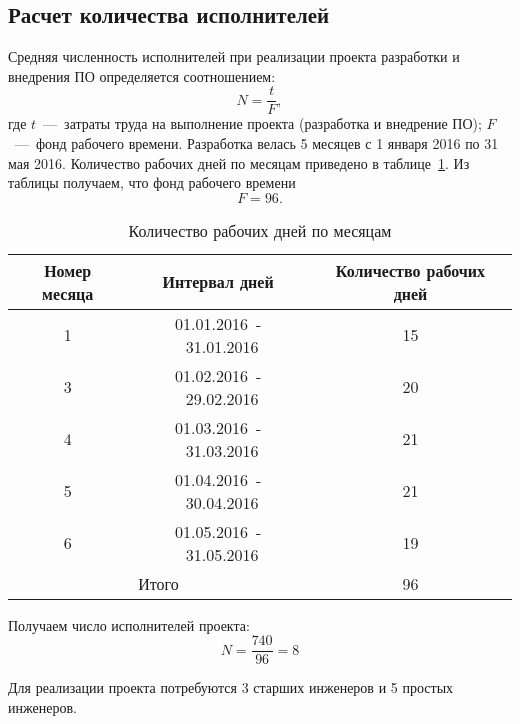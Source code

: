     \subsection{Расчет количества исполнителей}
    \label{subsec:slaves}
        Средняя численность исполнителей при реализации проекта разработки и внедрения ПО определяется соотношением:
        \begin{equation}
            N=\dfrac {t} {F},
        \end{equation}
        где $t$~---~затраты труда на выполнение проекта (разработка и внедрение ПО); $F$~---~фонд рабочего времени.
        Разработка велась 5 месяцев с 1 января 2016 по 31 мая 2016.
        Количество рабочих дней по месяцам приведено в таблице~\ref{tabular:work_day}. Из таблицы получаем, что фонд рабочего времени $$F=96.$$
        \begin{table}[h!]
            \caption{Количество рабочих дней по месяцам\bigskip}
            \centering
            \label{tabular:work_day}
            \begin{tabular}{|c|c|c|}
                \hline
                \bf{Номер месяца} & \bf{Интервал дней}& \bf{Количество рабочих дней} \\ \hline
                1 & 01.01.2016~-~31.01.2016 & 15 \\ \hline
                3 & 01.02.2016~-~29.02.2016 & 20 \\ \hline
                4 & 01.03.2016~-~31.03.2016 & 21 \\ \hline
                5 & 01.04.2016~-~30.04.2016 & 21 \\ \hline
                6 & 01.05.2016~-~31.05.2016 & 19 \\ \hline
                \multicolumn{2}{|c|}{Итого} & 96 \\ \hline
            \end{tabular}
        \end{table}

        Получаем число исполнителей проекта:
        \begin{equation*}
            N=\dfrac{740}{96}=8
        \end{equation*}

        Для реализации проекта потребуются 3 старших инженеров и 5 простых инженеров.

    \clearpage
